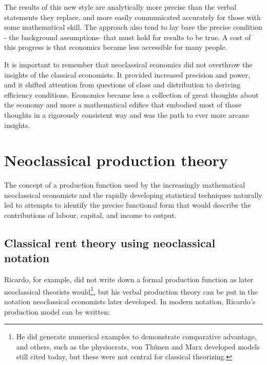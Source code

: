 The results of this new style are analytically more precise than the verbal statements they replace, and more easily communicated accurately for those with some mathematical skill. The approach also tend to lay bare the precise condition - the background assumptions- that must hold for results to be true. A cost of this progress is that economics became less accessible for many people. 

It is important to remember that neoclassical economics did not overthrow the insights of the classical economists. It provided increased precision and power, and it shifted attention from questions of class and distribution to deriving efficiency conditions. Economics became less a collection of great thoughts about the economy and more a mathematical edifice that embodied most of those thoughts in a rigorously consistent way and was the path to ever more arcane insights.

\section{Neoclassical production theory}
The concept of a production function used by the increasingly mathematical neoclassical economists and  the rapidly developing statistical techniques  naturally led to attempts to identify the precise \gls{functional form} that would describe the contributions of labour, capital, and income to output.
 
\subsection{Classical rent theory using neoclassical notation}
Ricardo, for example, did not write down a formal production function as later \gls{neoclassical} theorists would\footnote{He did generate numerical examples to demonstrate comparative advantage, and others, such as the physiocrats, von Th\"unen and Marx developed models still cited today, but these were not central for classical theorizing. }, but his verbal production theory can be put in the notation neoclassical economists later developed. In modern notation, Ricardo's production model can be written: 


